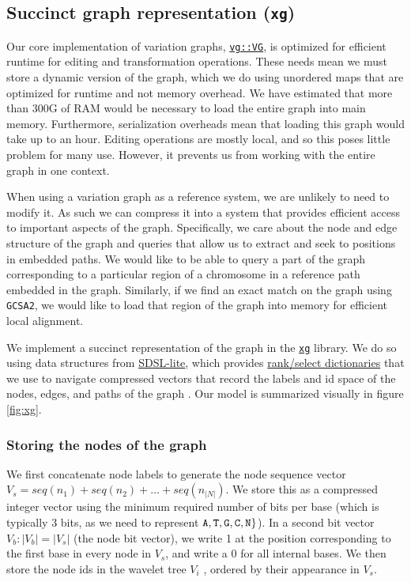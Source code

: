 \documentclass{article}
\begin{document}
\subsection{Succinct graph representation ({\tt xg})}

Our core implementation of variation graphs, \href{https://github.com/vgteam/vg/blob/fbcb6e62/src/vg.hpp#L196-L1146}{{\tt vg::VG}}, is optimized for efficient runtime for editing and transformation operations.
These needs mean we must store a dynamic version of the graph, which we do using unordered maps that are optimized for runtime and not memory overhead.
We have estimated that more than 300G of RAM would be necessary to load the entire graph into main memory.
Furthermore, serialization overheads mean that loading this graph would take up to an hour.
Editing operations are mostly local, and so this poses little problem for many use.
However, it prevents us from working with the entire graph in one context.

When using a variation graph as a reference system, we are unlikely to need to modify it.
As such we can compress it into a system that provides efficient access to important aspects of the graph.
Specifically, we care about the node and edge structure of the graph and queries that allow us to extract and seek to positions in embedded paths.
We would like to be able to query a part of the graph corresponding to a particular region of a chromosome in a reference path embedded in the graph.
Similarly, if we find an exact match on the graph using {\tt GCSA2}, we would like to load that region of the graph into memory for efficient local alignment.

We implement a succinct representation of the graph in the \href{https://github.com/vgteam/xg}{{\tt xg}} library.
We do so using data structures from \href{https://github.com/simongog/sdsl-lite}{SDSL-lite}, which provides \href{https://en.wikipedia.org/wiki/Succinct_data_structure#Succinct_dictionaries}{rank/select dictionaries} that we use to navigate compressed vectors that record the labels and id space of the nodes, edges, and paths of the graph \cite{okanohara2007}.
Our model is summarized visually in figure \ref{fig:xg}.

\subsubsection{Storing the nodes of the graph}

We first concatenate node labels to generate the node sequence vector $V_s = seq(n_1) + seq(n_2) + \ldots + seq(n_{|N|})$.
We store this as a compressed integer vector using the minimum required number of bits per base (which is typically 3 bits, as we need to represent ${\tt A, T, G, C, N} \}$).
In a second bit vector $V_b : |V_b| = |V_s|$ (the node bit vector), we write 1 at the position corresponding to the first base in every node in $V_s$, and write a 0 for all internal bases.
We then store the node ids in the wavelet tree $V_i$ \cite{grossi2003high}, ordered by their appearance in $V_s$.
\end{document}
